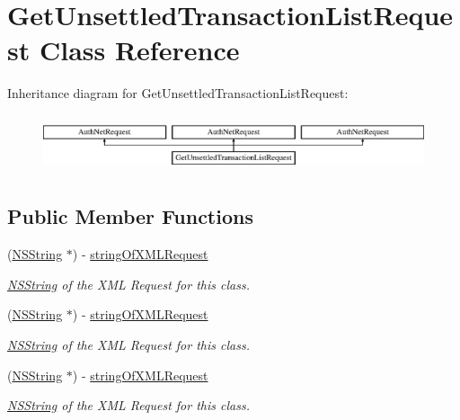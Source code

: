 \hypertarget{interface_get_unsettled_transaction_list_request}{
\section{GetUnsettledTransactionListRequest Class Reference}
\label{interface_get_unsettled_transaction_list_request}
}
Inheritance diagram for GetUnsettledTransactionListRequest:\begin{figure}[H]
\begin{center}
\leavevmode
\includegraphics[height=1.704718cm]{interface_get_unsettled_transaction_list_request}
\end{center}
\end{figure}
\subsection*{Public Member Functions}
\begin{DoxyCompactItemize}
\item 
(\hyperlink{class_n_s_string}{NSString} $\ast$) -\/ \hyperlink{interface_get_unsettled_transaction_list_request_a602ff13daa999aaaeb265e2977883ff1}{stringOfXMLRequest}
\begin{DoxyCompactList}\small\item\em \hyperlink{class_n_s_string}{NSString} of the XML Request for this class. \item\end{DoxyCompactList}\item 
(\hyperlink{class_n_s_string}{NSString} $\ast$) -\/ \hyperlink{interface_get_unsettled_transaction_list_request_a602ff13daa999aaaeb265e2977883ff1}{stringOfXMLRequest}
\begin{DoxyCompactList}\small\item\em \hyperlink{class_n_s_string}{NSString} of the XML Request for this class. \item\end{DoxyCompactList}\item 
(\hyperlink{class_n_s_string}{NSString} $\ast$) -\/ \hyperlink{interface_get_unsettled_transaction_list_request_a602ff13daa999aaaeb265e2977883ff1}{stringOfXMLRequest}
\begin{DoxyCompactList}\small\item\em \hyperlink{class_n_s_string}{NSString} of the XML Request for this class. \item\end{DoxyCompactList}\end{DoxyCompactItemize}
